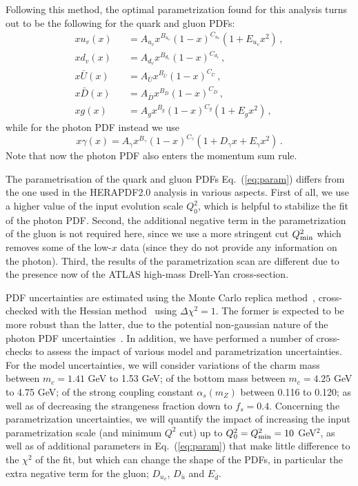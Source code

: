 Following this method, the optimal parametrization found for this analysis turns
out to be the following for the quark and gluon PDFs:
\begin{eqnarray}
  \nonumber
  xu_v(x) &&= A_{u_v}x^{B_{u_v}}(1-x)^{C_{u_v}}(1+E_{u_v}x^{2})\, , \\
  \nonumber
xd_v(x) &&= A_{d_v}x^{B_{d_v}}(1-x)^{C_{d_v}}\, , \\
x\bar{U}(x) &&= A_{\bar{U}}x^{B_{\bar{U}}}(1-x)^{C_{\bar{U}}}\, , \\
\nonumber
x\bar{D}(x) &&= A_{\bar{D}}x^{B_{\bar{D}}}(1-x)^{C_{\bar{D}}}\, , \\
\nonumber
\label{eq:param}
xg(x) &&= A_{g}x^{B_{g}}(1-x)^{C_{g}}(1+E_{g}x^{2})\, ,
\end{eqnarray}
while for the photon PDF instead we use
\begin{equation}
x\gamma(x) = A_{\gamma}x^{B_{\gamma}}(1-x)^{C_{\gamma}}(1+D_{\gamma}x+E_{\gamma}x^{2}) \, .
\end{equation}
Note that now the photon PDF also enters the momentum sum rule.

The parametrisation of the quark and gluon PDFs Eq.~(\ref{eq:param}) differs from the one used
in the HERAPDF2.0 analysis in various aspects.
%
First of all, we use a higher value of the input evolution scale $Q^2_0$, which is helpful
to stabilize the fit of the photon PDF.
%
Second, the additional negative term in the parametrization of the gluon
is not required here, since we use a more stringent cut $Q_{\rm min}^2$ which removes
some of the low-$x$ data (since they do not provide any information on the photon).
%
Third, the results of the parametrization scan are different due to the presence now
of the ATLAS high-mass Drell-Yan cross-section.

PDF uncertainties are estimated using the Monte Carlo
replica method~\cite{DelDebbio:2004xtd}, cross-checked
with the Hessian method~\cite{Pumplin:2001ct} using $\Delta\chi^2=1$.
%
The former is expected to be more robust than the latter, due to the potential
non-gaussian nature of the photon PDF uncertainties~\cite{Ball:2013hta}.
%
In addition, we have performed a number of cross-checks to assess the impact
of various model and parametrization uncertainties.
%
For the model uncertainties, we will consider variations of the charm mass
between $m_c=1.41$ GeV to 1.53 GeV; of the bottom mass between
$m_c=4.25$ GeV to 4.75 GeV; of the strong
coupling constant $\alpha_s(m_Z)$ between 0.116 to 0.120; as well
as of decreasing the strangeness fraction down to  $f_s=0.4$.
%
Concerning the parametrization uncertainties, we will quantify the impact of
 increasing the input parametrization scale
 (and minimum $Q^2$ cut) up to $Q_0^2=Q^2_{\rm min}=10$ GeV$^2$, as well as
 of additional parameters in Eq.~(\ref{eq:param}) that make little difference to the $\chi^2$ of the fit, but which can change the shape of the PDFs, in particular the extra negative term for the gluon; $D_{u_v}$, $D_{\bar{u}}$ and $E_{\bar{d}}$.
